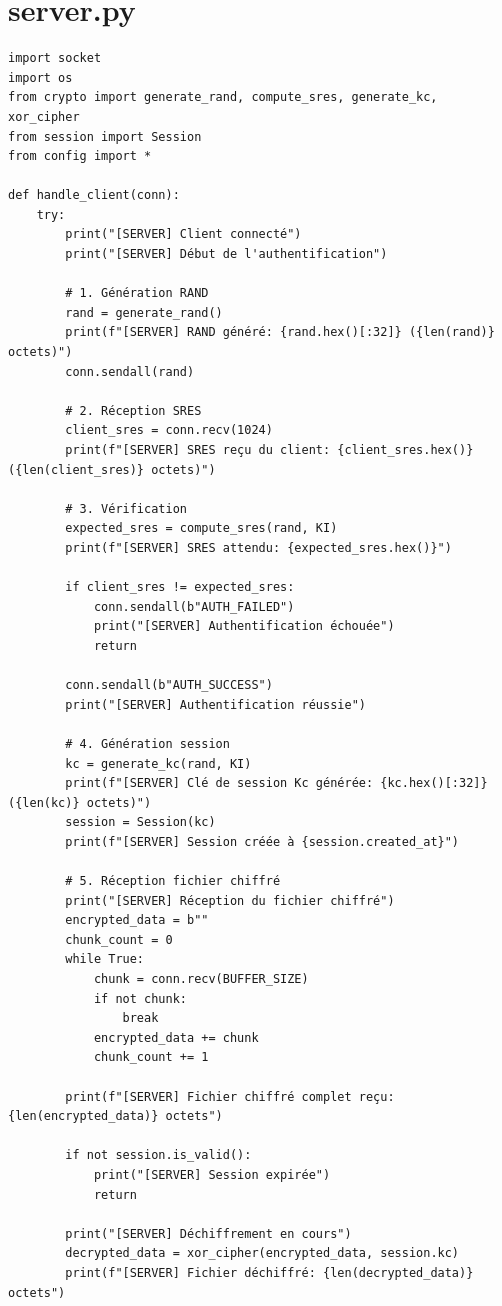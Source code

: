 \documentclass[12pt,a4paper]{report}
\begin{document}
\section{server.py}
\begin{verbatim}
import socket
import os
from crypto import generate_rand, compute_sres, generate_kc, xor_cipher
from session import Session
from config import *

def handle_client(conn):
    try:
        print("[SERVER] Client connecté")
        print("[SERVER] Début de l'authentification")

        # 1. Génération RAND
        rand = generate_rand()
        print(f"[SERVER] RAND généré: {rand.hex()[:32]} ({len(rand)} octets)")
        conn.sendall(rand)

        # 2. Réception SRES
        client_sres = conn.recv(1024)
        print(f"[SERVER] SRES reçu du client: {client_sres.hex()} ({len(client_sres)} octets)")

        # 3. Vérification
        expected_sres = compute_sres(rand, KI)
        print(f"[SERVER] SRES attendu: {expected_sres.hex()}")

        if client_sres != expected_sres:
            conn.sendall(b"AUTH_FAILED")
            print("[SERVER] Authentification échouée")
            return

        conn.sendall(b"AUTH_SUCCESS")
        print("[SERVER] Authentification réussie")

        # 4. Génération session
        kc = generate_kc(rand, KI)
        print(f"[SERVER] Clé de session Kc générée: {kc.hex()[:32]} ({len(kc)} octets)")
        session = Session(kc)
        print(f"[SERVER] Session créée à {session.created_at}")

        # 5. Réception fichier chiffré
        print("[SERVER] Réception du fichier chiffré")
        encrypted_data = b""
        chunk_count = 0
        while True:
            chunk = conn.recv(BUFFER_SIZE)
            if not chunk:
                break
            encrypted_data += chunk
            chunk_count += 1

        print(f"[SERVER] Fichier chiffré complet reçu: {len(encrypted_data)} octets")

        if not session.is_valid():
            print("[SERVER] Session expirée")
            return

        print("[SERVER] Déchiffrement en cours")
        decrypted_data = xor_cipher(encrypted_data, session.kc)
        print(f"[SERVER] Fichier déchiffré: {len(decrypted_data)} octets")


\end{verbatim}
\end{document}
